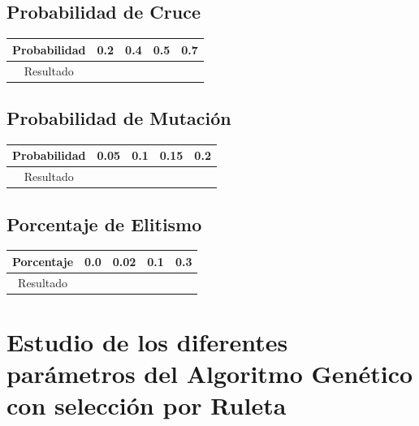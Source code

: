 \documentclass[12pt]{article}
\begin{document}
	

\subsection{Probabilidad de Cruce}
\begin{table}[H]
\begin{center}
\begin{tabular}{|ccccc|} \hline
Probabilidad   & 0.2 & 0.4 & 0.5 & 0.7 \\  \hline
Resultado  &  &  &  &  \\ \hline
\end{tabular}
\end{center}
\end{table}

	

\subsection{Probabilidad de Mutación}
\begin{table}[H]
\begin{center}
\begin{tabular}{|ccccc|} \hline
Probabilidad   & 0.05 & 0.1 & 0.15 & 0.2 \\  \hline
Resultado  &   &  &  &  \\ \hline
\end{tabular}
\end{center}
\end{table}

	

\subsection{Porcentaje de Elitismo}
\begin{table}[H]
\begin{center}
\begin{tabular}{|ccccc|} \hline
Porcentaje   & 0.0 & 0.02 & 0.1 & 0.3 \\  \hline
Resultado  &   &  &  &  \\ \hline
\end{tabular}
\end{center}
\end{table}


\section{Estudio de los diferentes parámetros del Algoritmo Genético con selección por Ruleta}
\end{document}
